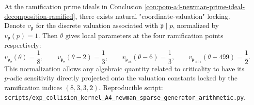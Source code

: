 \begin{conclusion}\label{con:pom-a4-newman-normalized-local-parameters}
At the ramification prime ideals in Conclusion \ref{con:pom-a4-newman-prime-ideal-decomposition-ramified}, there exists natural "coordinate-valuation" locking.
Denote \(v_{\mathfrak p}\) for the discrete valuation associated with \(\mathfrak p\mid p\), normalized by \(v_{\mathfrak p}(p)=1\).
Then \(\theta\) gives local parameters at the four ramification points respectively:
\[
v_{\mathfrak p_2}(\theta)=\frac{1}{8},\qquad
v_{\mathfrak p_7}(\theta-2)=\frac{1}{3},\qquad
v_{\mathfrak p_{23}}(\theta-6)=\frac{1}{3},\qquad
v_{\mathfrak p_{1151}}(\theta+499)=\frac{1}{2}.
\]
This normalization allows any algebraic quantity related to criticality to have its \(p\)-adic sensitivity directly projected onto the valuation constants locked by the ramification indices \((8,3,3,2)\).
Reproducible script: \texttt{scripts/exp\_collision\_kernel\_A4\_newman\_sparse\_generator\_arithmetic.py}.
\end{conclusion}


